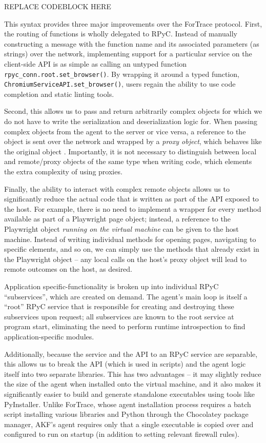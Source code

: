 \documentclass[letterpaper,12pt]{report}
\begin{document}
REPLACE CODEBLOCK HERE

This syntax provides three major improvements over the ForTrace
protocol. First, the routing of functions is wholly delegated to RPyC.
Instead of manually constructing a message with the function name and
its associated parameters (as strings) over the network, implementing
support for a particular service on the client-side API is as simple as
calling an untyped function \texttt{rpyc\_conn.root.set\_browser()}. By
wrapping it around a typed function,
\texttt{ChromiumServiceAPI.set\_browser()}, users regain the ability to
use code completion and static linting tools.

Second, this allows us to pass and return arbitrarily complex objects
for which we do not have to write the serialization and deserialization
logic for. When passing complex objects from the agent to the server or
vice versa, a reference to the object is sent over the network and
wrapped by a \emph{proxy object}, which behaves like the original object
\cite{TheoryOperationRPyC}. Importantly, it is not necessary to
distinguish between local and remote/proxy objects of the same type when
writing code, which elements the extra complexity of using proxies.

Finally, the ability to interact with complex remote objects allows us
to significantly reduce the actual code that is written as part of the
API exposed to the host. For example, there is no need to implement a
wrapper for every method available as part of a Playwright page object;
instead, a reference to the Playwright object \emph{running on the
virtual machine} can be given to the host machine. Instead of writing
individual methods for opening pages, navigating to specific elements,
and so on, we can simply use the methods that already exist in the
Playwright object -- any local calls on the host's proxy object will
lead to remote outcomes on the host, as desired.

Application specific-functionality is broken up into individual RPyC
``subservices'', which are created on demand. The agent's main loop is
itself a ``root'' RPyC service that is responsible for creating and
destroying these subservices upon request; all subservices are known to
the root service at program start, eliminating the need to perform
runtime introspection to find application-specific modules.

Additionally, because the service and the API to an RPyC service are
separable, this allows us to break the API (which is used in scripts)
and the agent logic itself into two separate libraries. This has two
advantages -- it may slightly reduce the size of the agent when
installed onto the virtual machine, and it also makes it significantly
easier to build and generate standalone executables using tools like
PyInstaller. Unlike ForTrace, whose agent installation process requires
a batch script installing various libraries and Python through the
Chocolatey package manager, AKF's agent requires only that a single
executable is copied over and configured to run on startup (in addition
to setting relevant firewall rules).
\end{document}
